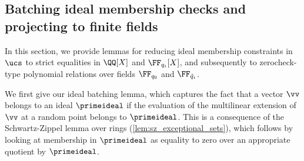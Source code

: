 \subsection{Batching ideal membership checks and projecting to finite fields}
\label{sec:zincplus-ideal-batching}

In this section, we provide lemmas for reducing ideal membership constraints in $\ucs$ to strict equalities in $\QQ[X]$ and $\FF_{q_i}[X]$, and subsequently to zerocheck-type polynomial relations over fields $\FF_{q_0}$ and $\FF_{\tilde{q}_i}$.

We first give our ideal batching lemma, which captures the fact that \whp a vector $\vv$ belongs to an ideal $\primeideal$ if the evaluation of the multilinear extension of $\vv$ at a random point belongs to $\primeideal$. This is a consequence of the Schwartz-Zippel lemma over rings (\cref{lem:sz_exceptional_sets}), which follows by looking at membership in $\primeideal$ as equality to zero over an appropriate quotient by $\primeideal$.

